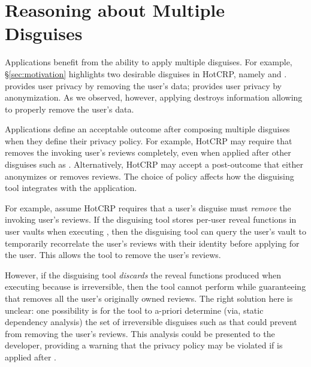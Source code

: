\section{Reasoning about Multiple Disguises}
\label{sec:composition}

Applications benefit from the ability to apply multiple disguises. For example,
\S\ref{sec:motivation} highlights two desirable disguises in HotCRP, namely \gdpr and \ca. \gdpr
provides user privacy by removing the user's data; \ca provides user privacy by anonymization.
As we observed, however, applying \ca destroys information allowing \gdpr to properly remove the
user's data.

Applications define an acceptable outcome after composing multiple disguises when they define their
privacy policy.
For example, HotCRP may require that \gdpr removes the invoking user's reviews completely, even when
applied after other disguises such as \ca.  Alternatively, HotCRP may accept a post-\gdpr outcome that either
anonymizes or removes reviews. 
The choice of policy affects how the disguising tool integrates with the application.

For example, assume HotCRP requires that a user's \gdpr disguise must \emph{remove} the invoking
user's reviews. If the disguising tool stores per-user reveal functions in user vaults when
executing \ca, then the disguising tool can query the user's vault to temporarily recorrelate the
user's reviews with their identity before applying \gdpr for the user.  This allows the tool to
remove the user's reviews.
%

However, if the disguising tool \emph{discards} the reveal functions produced when executing \ca
because \ca is irreversible, then the tool cannot perform \gdpr while guaranteeing that \gdpr
removes all the user's originally owned reviews.  The right solution here is unclear: one
possibility is for the tool to a-priori determine (via, \eg static dependency analysis) the set of
irreversible disguises such as \ca that could prevent \gdpr from removing the user's reviews. This
analysis could be presented to the developer, providing a warning that the privacy policy may be
violated if \gdpr is applied after \ca.

